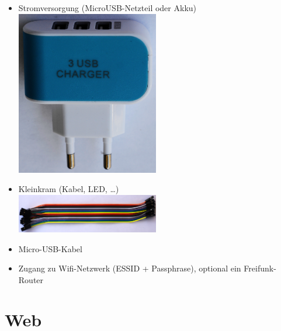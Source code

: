 \documentclass[
notumble,
]{leaflet}
\begin{document}
\begin{itemize}
\item Stromversorgung (MicroUSB-Netzteil oder Akku) \\\includegraphics[width=0.49\textwidth]{images/sensor/usbcharger.jpg}
\item Kleinkram (Kabel, LED, \dots) \\\includegraphics[width=0.49\textwidth]{images/sensor/cable_dupont.jpg}
\item Micro-USB-Kabel
\item Zugang zu Wifi-Netzwerk (ESSID + Passphrase), optional ein Freifunk-Router
\end{itemize}

% 

\section{Web}
\end{document}
